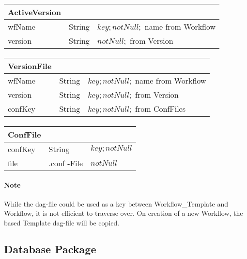 \paragraph{}
\begin{tabular}{|p{4cm}|p{2cm}|p{6cm}|}
	\hline
	\textbf{ActiveVersion} & & \\
	\hline
	wfName & String & $key; notNull;$ name from Workflow\\
	\hline
	version & String & $notNull;$ from Version\\
	\hline
\end{tabular}

\paragraph{}
\begin{tabular}{|p{4cm}|p{2cm}|p{6cm}|}
	\hline
	\textbf{VersionFile} & & \\
	\hline
	wfName & String & $key; notNull;$ name from Workflow\\
	\hline
	version & String & $key; notNull;$ from Version \\
	\hline
	confKey & String & $key; notNull;$ from ConfFiles \\
	\hline
\end{tabular}

\paragraph{}
\begin{tabular}{|p{4cm}|p{2cm}|p{6cm}|}
	\hline
	\textbf{ConfFile} & & \\
	\hline
	confKey & String & $key; notNull$ \\
	\hline
	file & .conf -File & $notNull$ \\
	\hline
\end{tabular}

\paragraph{Note}While the dag-file could be used as a key between Workflow\_Template and Workflow, it is not efficient to traverse over. On creation of a new Workflow, the based Template dag-file will be copied.


\subsection{Database Package}

